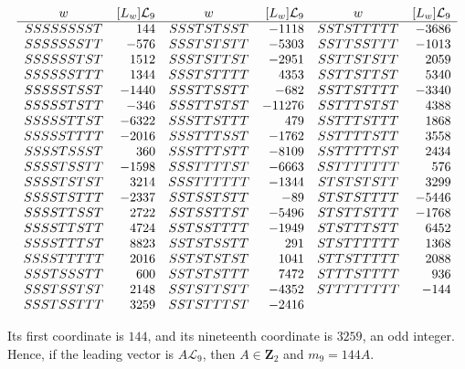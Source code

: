 {\small
\[
\begin{array}{cr@{\quad}cr@{\quad}cr}
w&[L_w]\mathcal L_9&w&[L_w]\mathcal L_9&w&[L_w]\mathcal L_9\\ \hline
SSSSSSSST&144&SSSTSTSST&-1118&SSTSTTTTT&-3686\\
SSSSSSSTT&-576&SSSTSTSTT&-5303&SSTTSSTTT&-1013\\
SSSSSSTST&1512&SSSTSTTST&-2951&SSTTSTSTT&2059\\
SSSSSSTTT&1344&SSSTSTTTT&4353&SSTTSTTST&5340\\
SSSSSTSST&-1440&SSSTTSSTT&-682&SSTTSTTTT&-3340\\
SSSSSTSTT&-346&SSSTTSTST&-11276&SSTTTSTST&4388\\
SSSSSTTST&-6322&SSSTTSTTT&479&SSTTTSTTT&1868\\
SSSSSTTTT&-2016&SSSTTTSST&-1762&SSTTTTSTT&3558\\
SSSSTSSST&360&SSSTTTSTT&-8109&SSTTTTTST&2434\\
SSSSTSSTT&-1598&SSSTTTTST&-6663&SSTTTTTTT&576\\
SSSSTSTST&3214&SSSTTTTTT&-1344&STSTSTSTT&3299\\
SSSSTSTTT&-2337&SSTSSTSTT&-89&STSTSTTTT&-5446\\
SSSSTTSST&2722&SSTSSTTST&-5496&STSTTSTTT&-1768\\
SSSSTTSTT&4724&SSTSSTTTT&-1949&STSTTTSTT&6452\\
SSSSTTTST&8823&SSTSTSSTT&291&STSTTTTTT&1368\\
SSSSTTTTT&2016&SSTSTSTST&1041&STTSTTTTT&2088\\
SSSTSSSTT&600&SSTSTSTTT&7472&STTTSTTTT&936\\
SSSTSSTST&2148&SSTSTTSTT&-4352&STTTTTTTT&-144\\
SSSTSSTTT&3259&SSTSTTTST&-2416&&\\
\end{array}
\]
}

Its first coordinate is $144$, and its nineteenth coordinate is
$3259$, an odd integer. Hence, if the leading vector is
$A\mathcal L_9$, then $A\in\mathbf Z_2$ and $m_9=144A$.

